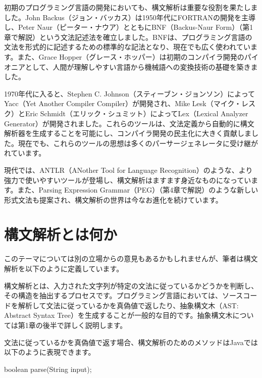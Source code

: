 初期のプログラミング言語の開発においても、構文解析は重要な役割を果たしました。John
Backus（ジョン・バッカス）は1950年代にFORTRANの開発を主導し、Peter
Naur（ピーター・ナウア）とともにBNF（Backus-Naur
Form）（第1章で解説）という文法記述法を確立しました。BNFは、プログラミング言語の文法を形式的に記述するための標準的な記法となり、現在でも広く使われています。また、Grace
Hopper（グレース・ホッパー）は初期のコンパイラ開発のパイオニアとして、人間が理解しやすい言語から機械語への変換技術の基礎を築きました。

1970年代に入ると、Stephen C.
Johnson（スティーブン・ジョンソン）によってYacc（Yet Another Compiler
Compiler）が開発され、Mike Lesk（マイク・レスク）とEric
Schmidt（エリック・シュミット）によってLex（Lexical Analyzer
Generator）が開発されました。これらのツールは、文法定義から自動的に構文解析器を生成することを可能にし、コンパイラ開発の民主化に大きく貢献しました。現在でも、これらのツールの思想は多くのパーサージェネレータに受け継がれています。

現代では、ANTLR（ANother Tool for Language
Recognition）のような、より強力で使いやすいツールが登場し、構文解析はますます身近なものになっています。また、Parsing
Expression
Grammar（PEG）（第4章で解説）のような新しい形式文法も提案され、構文解析の世界は今なお進化を続けています。

\section*{構文解析とは何か}\label{0.2}

このテーマについては別の立場からの意見もあるかもしれませんが、筆者は構文解析を以下のように定義しています。

構文解析とは、入力された文字列が特定の文法に従っているかどうかを判断し、その構造を抽出するプロセスです。プログラミング言語においては、ソースコードを解析して文法に従っているかを真偽値で返したり、抽象構文木（AST:
Abstract Syntax
Tree）を生成することが一般的な目的です。抽象構文木については第1章の後半で詳しく説明します。

文法に従っているかを真偽値で返す場合、構文解析のためのメソッドはJavaでは以下のように表現できます。

\begin{codescreen}{}
boolean parse(String input);
\end{codescreen}

